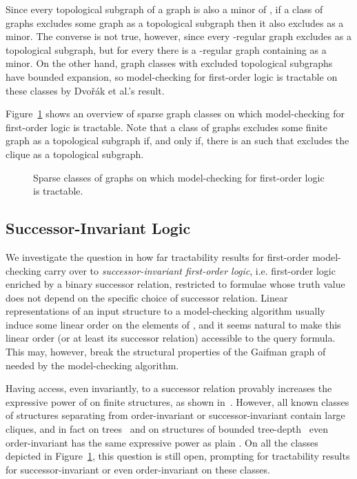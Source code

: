 \documentclass[12pt]{amsart}
\begin{document}
Since every topological subgraph of a graph  is also a minor of
, if a class  of graphs excludes some graph  as a
topological subgraph then it also excludes  as a minor. The
converse is not true, however, since every -regular graph excludes
 as a topological subgraph, but for every  there is a
-regular graph containing  as a minor. On the other hand,
graph classes with excluded topological subgraphs have bounded
expansion, so model-checking for first-order logic is tractable on
these classes by {Dvo\v r\'ak} et al.'s
result.

Figure~\ref{fig:sparseclasses} shows an overview of sparse graph
classes on which model-checking for first-order logic is
tractable. Note that a class  of graphs excludes some finite
graph  as a topological subgraph if, and only if, there is an  such that  excludes the clique  as a topological
subgraph.

\begin{figure}
  \begin{center}
  \end{center}
  \caption{Sparse classes of graphs on which model-checking for
    first-order logic is tractable.}
  \label{fig:sparseclasses}
\end{figure}

\subsection*{Successor-Invariant Logic}

We investigate the question in how far tractability results for
first-order model-checking carry over to \emph{successor-invariant
  first-order logic}, i.e. first-order logic enriched by a binary
successor relation, restricted to formulae whose truth value does not
depend on the specific choice of successor relation. Linear
representations of an input structure  to a model-checking
algorithm usually induce some linear order on the elements of ,
and it seems natural to make this linear order (or at least its
successor relation) accessible to the query formula. This may,
however, break the structural properties of the Gaifman graph of 
needed by the model-checking algorithm.

Having access, even invariantly, to a successor relation provably
increases the expressive power of  on finite structures, as shown
in~\cite{Rossman07}. However, all known classes of structures
separating  from order-invariant or successor-invariant 
contain large cliques, and in fact on trees~\cite{BenediktS09} and on
structures of bounded tree-depth~\cite{EickmeyerEH14} even
order-invariant  has the same expressive power as plain . On
all the classes depicted in Figure~\ref{fig:sparseclasses}, this
question is still open, prompting for tractability results for
successor-invariant or even order-invariant  on these classes.
\end{document}
